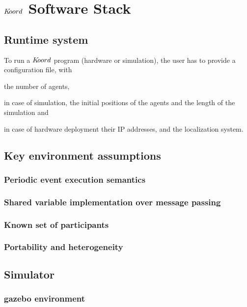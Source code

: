 


\section{$K\kern-2pt oord$ Software Stack}
\label{sec:software}

\subsection{Runtime system}



To run a $K\kern-2pt oord$ program (hardware or simulation), the user has to provide a configuration file, with 
\begin{inparaenum}
\item the number of agents, 
\item in case of simulation, the initial positions of the agents and the length of the simulation and 
\item in case of hardware deployment their IP addresses, 
and the localization system.
\end{inparaenum} 

\subsection{Key environment assumptions} 


\subsubsection{Periodic event execution semantics}


\subsubsection{Shared variable implementation over message passing}


\subsubsection{Known set of participants}
\subsubsection{Portability and heterogeneity}


\subsection{Simulator}
\subsubsection{gazebo environment}

